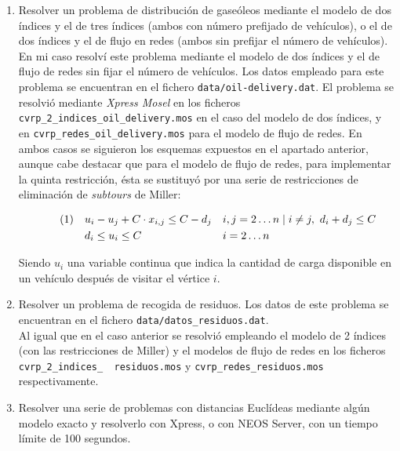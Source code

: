 \documentclass[a4paper,11pt]{article}
\newcommand\numberthis{							%
	\addtocounter{equation}{1}\tag{\theequation}
}
\begin{document}
\begin{enumerate}
\item Resolver un problema de distribución de gaseóleos mediante el modelo de dos índices y el de tres índices (ambos con número prefijado de vehículos), o el de dos índices y el de flujo en redes (ambos sin prefijar el número de vehículos).\\

En mi caso resolví este problema mediante el modelo de dos índices y el de flujo de redes sin fijar el número de vehículos. Los datos empleado para este problema se encuentran en el fichero \texttt{data/oil-delivery.dat}. El problema se resolvió mediante \textit{Xpress Mosel} en los ficheros \texttt{cvrp\_2\_indices\_oil\_delivery.mos} en el caso del modelo de dos índices, y en \texttt{cvrp\_redes\_oil\_delivery.mos} para el modelo de flujo de redes. En ambos casos se siguieron los esquemas expuestos en el apartado anterior, aunque cabe destacar que para el modelo de flujo de redes, para implementar la quinta restricción, ésta se sustituyó por una serie de restricciones de eliminación de \textit{subtours} de Miller:

\begin{align*}\numberthis
    &						&& u_{i} - u_{j} + C \cdot x_{i,j} \leq C - d_{j}	&& i,j=2 \ldots n \mid i \neq j,  \ d_{i} + d_{j} \leq C 	\\
	&						&& d_{i} \leq u_{i} \leq C		&& i=2 \ldots n	\\
\end{align*}

Siendo ${u_{i}}$ una variable continua que indica la cantidad de carga disponible en un vehículo después de visitar el vértice ${i}$.

\item Resolver un problema de recogida de residuos. Los datos de este problema se encuentran en el fichero \texttt{data/datos\_residuos.dat}.\\

Al igual que en el caso anterior se resolvió empleando el modelo de 2 índices (con las restricciones de Miller) y el modelos de flujo de redes en los ficheros \texttt{cvrp\_2\_indices\_ \ residuos.mos} y  \texttt{cvrp\_redes\_residuos.mos} respectivamente.

\item Resolver una serie de problemas con distancias Euclídeas mediante algún modelo exacto y resolverlo con Xpress, o con NEOS Server, con un tiempo límite de 100 segundos.\\


\end{enumerate}
\end{document}
